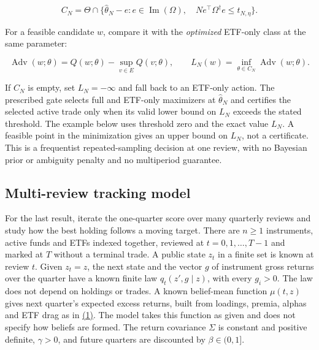 \documentclass[11pt]{article}
\begin{document}
\begin{equation*}
C_N=\Theta\cap\{\widehat\theta_N-e:
e\in\operatorname{Im}(\Omega),\quad
N e^\top\Omega^\dagger e\leq t_{N,\eta}\}.
\end{equation*}

For a feasible candidate \(w\), compare it with the \emph{optimized}
ETF-only class at the same parameter:

\begin{equation*}
\operatorname{Adv}(w;\theta)
 =Q(w;\theta)-\sup_{v\in E}Q(v;\theta),\qquad
L_N(w)=\inf_{\theta\in C_N}\operatorname{Adv}(w;\theta).
\end{equation*}

If \(C_N\) is empty, set \(L_N=-\infty\) and fall back to an
ETF-only action. The prescribed gate selects full and ETF-only
maximizers at \(\widehat\theta_N\) and certifies the selected
active trade only when its valid lower bound on \(L_N\) exceeds
the stated threshold. The example below uses threshold zero
and the exact value \(L_N\). A feasible point in the minimization
gives an upper bound on \(L_N\), not a certificate. This is a
frequentist repeated-sampling decision at one review, with no
Bayesian prior or ambiguity penalty and no multiperiod guarantee.

\subsection*{Multi-review tracking model}

For the last result, iterate the one-quarter score over many
quarterly reviews and study how the best holding follows a moving
target. There are \(n\geq1\) instruments, active funds and ETFs
indexed together, reviewed at \(t=0,1,\ldots,T-1\) and marked at \(T\)
without a terminal trade. A public state \(z_t\) in a finite set is
known at review \(t\). Given \(z_t=z\), the next state and the vector
\(g\) of instrument gross returns over the quarter have a known finite
law \(q_t(z',g\mid z)\), with every \(g_i>0\). The law does not depend on
holdings or trades. A known belief-mean function \(\mu(t,z)\) gives
next quarter's expected excess returns, built from loadings, premia,
alphas and ETF drag as in \hyperref[eq:1]{(1)}. The model takes this function as given
and does not specify how beliefs are formed. The return covariance
\(\Sigma\) is constant and positive definite, \(\gamma>0\), and future
quarters are discounted by \(\beta\in(0,1]\).
\end{document}
